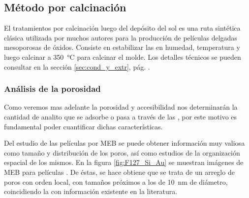 	\subsection{Método por calcinación}
	 	
	 		El tratamientos por calcinación luego del depósito del sol es una ruta sintética clásica utilizada por muchos autores para la producción de películas delgadas mesoporosas de óxidos\cite{Soler-Illia2002a,Brinker1999,Soler-Illia2006,Grosso2004,Innocenzi2013,angelome2011}. Consiste en estabilizar las \pdm\space en humedad, temperatura y luego calcinar a \SI{350}{\celsius} para calcinar el molde. Los detalles técnicos se pueden consultar en la sección \ref{sec:cond_y_extr}, pág. \pageref{sec:cond_y_extr}.

	 	\subsubsection{Análisis de la porosidad}

		 Como veremos mas adelante la porosidad y accesibilidad nos determinarán la cantidad de analito que se adsorbe o pasa a través de las \pdm, por este motivo es fundamental poder cuantificar dichas características. 

		 Del estudio de las películas por MEB se puede obtener información muy valiosa como tamaño y distribución de los poros, así como estudios de la organización espacial de los mismos. En la figura \ref{fig:F127_Si_Au} se muestran imágenes de MEB para películas \pdmF. De éstas, se hace obtiene que se trata de un arreglo de poros con orden local, con tamaños próximos a los de \SI{10}{\nm} de diámetro, coincidiendo la con información existente en la literatura\cite{urade2005,angelome2011,lee2006}.  

